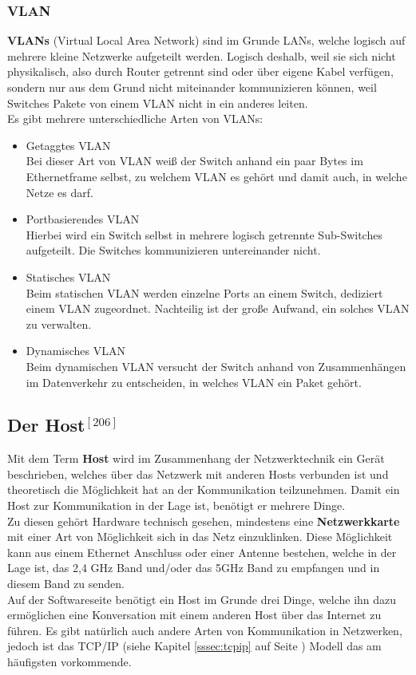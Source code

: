 \documentclass[12pt,a4paper]{report}
\begin{document}
\begin{onehalfspace}
\subsubsection{VLAN}\label{sssec:vlan}
\textbf{VLANs} (Virtual Local Area Network) sind im Grunde LANs, welche logisch auf mehrere kleine Netzwerke aufgeteilt werden. Logisch deshalb, weil sie sich nicht physikalisch, also durch Router getrennt sind oder über eigene Kabel verfügen, sondern nur aus dem Grund nicht miteinander kommunizieren können, weil Switches Pakete von einem VLAN nicht in ein anderes leiten.\\
Es gibt mehrere unterschiedliche Arten von VLANs:\\
\begin{itemize}
\item Getaggtes VLAN\\
Bei dieser Art von VLAN weiß der Switch anhand ein paar Bytes im Ethernetframe selbst, zu welchem VLAN es gehört und damit auch, in welche Netze es darf.
\item Portbasierendes VLAN\\
Hierbei wird ein Switch selbst in mehrere logisch getrennte Sub-Switches aufgeteilt. Die Switches kommunizieren untereinander nicht.
\item Statisches VLAN\\
Beim statischen VLAN werden einzelne Ports an einem Switch, dediziert einem VLAN zugeordnet. Nachteilig ist der große Aufwand, ein solches VLAN zu verwalten.
\item Dynamisches VLAN\\
Beim dynamischen VLAN versucht der Switch anhand von Zusammenhängen im Datenverkehr zu entscheiden, in welches VLAN ein Paket gehört. 
\end{itemize}

\subsection{Der Host$^{[206]}$}
Mit dem Term \textbf{Host} wird im Zusammenhang der Netzwerktechnik ein Gerät beschrieben, welches über das Netzwerk mit anderen Hosts verbunden ist und theoretisch die Möglichkeit hat an der Kommunikation teilzunehmen. Damit ein Host zur Kommunikation in der Lage ist, benötigt er mehrere Dinge.\\
Zu diesen gehört Hardware technisch gesehen, mindestens eine \textbf{Netzwerkkarte} mit einer Art von Möglichkeit sich in das Netz einzuklinken. Diese Möglichkeit kann aus einem Ethernet Anschluss oder einer Antenne bestehen, welche in der Lage ist, das 2,4 GHz Band und/oder das 5GHz Band zu empfangen und in diesem Band zu senden.\\
Auf der Softwareseite benötigt ein Host im Grunde drei Dinge, welche ihn dazu ermöglichen eine Konversation mit einem anderen Host über das Internet zu führen. Es gibt natürlich auch andere Arten von Kommunikation in Netzwerken, jedoch ist das TCP/IP (siehe Kapitel \ref{sssec:tcpip} auf Seite \pageref{sssec:tcpip}) Modell das am häufigsten vorkommende. 


\end{onehalfspace}
\end{document}
